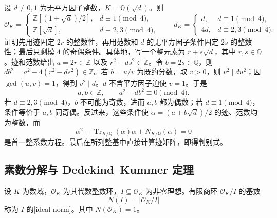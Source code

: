 \begin{example}\label{b3:exm:quadratic-integer-ring}
	设 \(d\ne0,1\) 为无平方因子整数，\(K=\mathbb Q(\sqrt d)\)。则
	\[
		\mathcal O_K=
		\begin{cases}
			\mathbb Z[(1+\sqrt d)/2],&d\equiv1\pmod4,\\
			\mathbb Z[\sqrt d],&d\equiv2,3\pmod4,
		\end{cases}
		\qquad d_K=
		\begin{cases}
			d,&d\equiv1\pmod4,\\
			4d,&d\equiv2,3\pmod4.
		\end{cases}
	\]
	证明先用迹固定 \(2r\) 的整数性，再用范数和 \(d\) 的无平方因子条件固定 \(2s\) 的整数性；最后只剩模 \(4\) 的奇偶条件。具体地，写一个整元素为 \(r+s\sqrt d\)，其中 \(r,s\in\mathbb Q\)。迹和范数给出 \(a=2r\in\mathbb Z\) 以及 \(r^2-ds^2\in\mathbb Z\)。令 \(b=2s\in\mathbb Q\)，则 \(db^2=a^2-4(r^2-ds^2)\in\mathbb Z\)。若 \(b=u/v\) 为既约分数，取 \(v>0\)，则 \(v^2\mid du^2\)；因 \(\gcd(u,v)=1\)，得到 \(v^2\mid d\)。\(d\) 不含平方因子迫使 \(v=1\)。于是
	\[
		a,b\in\mathbb Z,\qquad a^2-db^2\equiv0\pmod4.
	\]
	若 \(d\equiv2,3\pmod4\)，\(b\) 不可能为奇数，进而 \(a,b\) 都为偶数；若 \(d\equiv1\pmod4\)，条件等价于 \(a,b\) 同奇偶。反过来，这些条件使 \(\alpha=(a+b\sqrt d)/2\) 的迹、范数均为整数，而
	\[
		\alpha^2-\operatorname{Tr}_{K/\mathbb Q}(\alpha)\alpha +N_{K/\mathbb Q}(\alpha)=0
	\]
	是首一整系数方程。最后在所列整基中直接计算迹矩阵，即得判别式。
\end{example}

\subsection{素数分解与 Dedekind--Kummer 定理}
\label{b3:subsec:A02:03}

\begin{definition}\label{b3:def:integer-ideal-norm}
	设 \(K\) 为数域，\(\mathcal O_K\) 为其代数整数环，\(I\subseteq\mathcal O_K\) 为非零理想。有限商环 \(\mathcal O_K/I\) 的基数
	\[
		N(I)=|\mathcal O_K/I|
	\]
	称为 \(I\) 的[ideal norm]。其中 \(N(\mathcal O_K)=1\)。
\end{definition}

